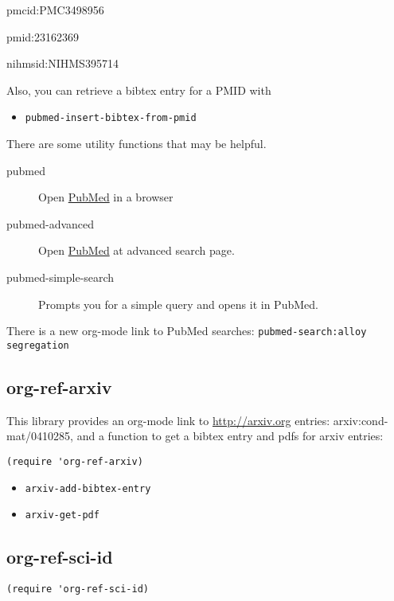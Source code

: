 \documentclass[11pt]{article}
\begin{document}
{pmcid:PMC3498956

pmid:23162369

nihmsid:NIHMS395714

Also, you can retrieve a bibtex entry for a PMID with

\begin{itemize}
\item \verb~pubmed-insert-bibtex-from-pmid~
\end{itemize}

There are some utility functions that may be helpful.

\begin{description}
\item[{pubmed}] Open \href{http://www.ncbi.nlm.nih.gov/pubmed}{PubMed} in a browser
\item[{pubmed-advanced}] Open \href{http://www.ncbi.nlm.nih.gov/pubmed/advanced}{PubMed} at advanced search page.
\item[{pubmed-simple-search}] Prompts you for a simple query and opens it in PubMed.
\end{description}

There is a new org-mode link to PubMed searches: \texttt{pubmed-search:alloy segregation}

\subsection{org-ref-arxiv}
\label{sec-2-7}

This library provides an org-mode link to \url{http://arxiv.org} entries:  arxiv:cond-mat/0410285, and a function to get a bibtex entry and pdfs for arxiv entries:

\begin{verbatim}
(require 'org-ref-arxiv)
\end{verbatim}

\begin{itemize}
\item \verb~arxiv-add-bibtex-entry~
\item \verb~arxiv-get-pdf~
\end{itemize}

\subsection{org-ref-sci-id}
\label{sec-2-8}
 

\begin{verbatim}
(require 'org-ref-sci-id)
\end{verbatim}

}
\end{document}
